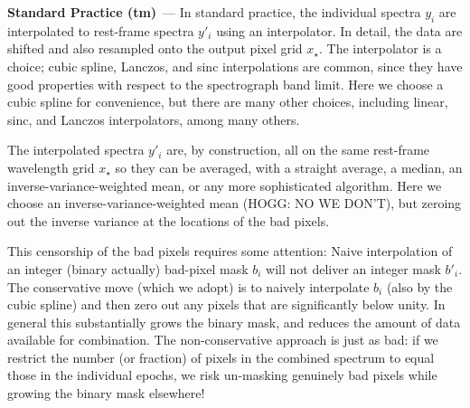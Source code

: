 \documentclass[modern]{aastex631}
\renewcommand{\paragraph}[1]{\medskip\par\noindent\textbf{#1}~---}
\begin{document}
\paragraph{Standard Practice (tm)}
In standard practice, the individual spectra $y_i$ are interpolated to rest-frame spectra $y'_i$ using an interpolator.
In detail, the data are shifted and also resampled onto the output pixel grid $x_\star$.
The interpolator is a choice; cubic spline, Lanczos, and sinc interpolations are common, since they have good properties with respect to the spectrograph band limit.
Here we choose a cubic spline for convenience, but there are many other choices, including linear, sinc, and Lanczos interpolators, among many others.

The interpolated spectra $y'_i$ are, by construction, all on the same rest-frame wavelength grid $x_\star$ so they can be averaged, with a straight average, a median, an inverse-variance-weighted mean, or any more sophisticated algorithm.
Here we choose an inverse-variance-weighted mean (HOGG: NO WE DON'T), but zeroing out the inverse variance at the locations of the bad pixels.

This censorship of the bad pixels requires some attention:
Naive interpolation of an integer (binary actually) bad-pixel mask $b_i$ will not deliver an integer mask $b'_i$.
The conservative move (which we adopt) is to naively interpolate $b_i$ (also by the cubic spline) and then zero out any pixels that are significantly below unity.
In general this substantially grows the binary mask, and reduces the amount of data available for combination.
The non-conservative approach is just as bad: if we restrict the number (or fraction) of pixels in the combined spectrum to equal those in the individual epochs, we risk un-masking genuinely bad pixels while growing the binary mask elsewhere!
\end{document}
